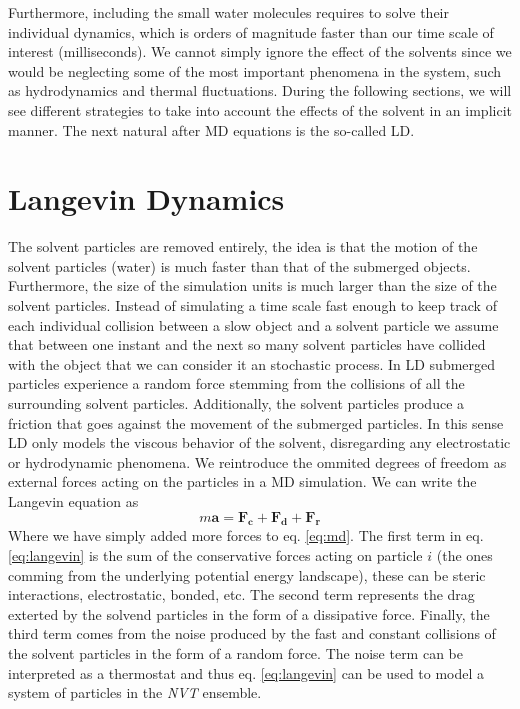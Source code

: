 \documentclass[ twoside,openright,titlepage,numbers=noenddot,%
headinclude,footinclude,cleardoublepage=empty,abstract=on,
BCOR=5mm,paper=a4,fontsize=11pt, dvipsnames
]{scrreprt}
\renewcommand{\vec}[1]{\bm{#1}}
\begin{document}
Furthermore, including the small water molecules requires to solve their individual dynamics, which is orders of magnitude faster than our time scale of interest (milliseconds). We cannot simply ignore the effect of the solvents since we would be neglecting some of the most important phenomena in the system, such as hydrodynamics and thermal fluctuations.
During the following sections, we will see different strategies to take into account the effects of the solvent in an implicit manner.
The next natural after \gls{MD} equations is the so-called \gls{LD}.

\section{Langevin Dynamics}\label{sec:langevin}

The solvent particles are removed entirely, the idea is that the motion of the solvent particles (water) is much faster than that of the submerged objects. Furthermore, the size of the simulation units is much larger than the size of the solvent particles. Instead of simulating a time scale fast enough to keep track of each individual collision between a slow object and a solvent particle we assume that between one instant and the next so many solvent particles have collided with the object that we can consider it an stochastic process.
In \gls{LD} submerged particles experience a random force stemming from the collisions of all the surrounding solvent particles. Additionally, the solvent particles produce a friction that goes against the movement of the submerged particles.
In this sense \gls{LD} only models the viscous behavior of the solvent, disregarding any electrostatic or hydrodynamic phenomena.
We reintroduce the ommited degrees of freedom as external forces acting on the particles in a \gls{MD} simulation. We can write the Langevin equation as
\begin{equation}
  \label{eq:langevin}
  m\vec{a} = \vec{F_c} + \vec{F_d} + \vec{F_r}
\end{equation}
Where we have simply added more forces to eq. \eqref{eq:md}. The first term in eq. \eqref{eq:langevin} is the sum of the conservative forces acting on particle $i$ (the ones comming from the underlying potential energy landscape), these can be steric interactions, electrostatic, bonded, etc. The second term represents the drag exterted by the solvend particles in the form of a dissipative force. Finally, the third term comes from the noise produced by the fast and constant collisions of the solvent particles in the form of a random force. The noise term can be interpreted as a thermostat and thus eq. \eqref{eq:langevin} can be used to model a system of particles in the \emph{NVT} ensemble.
\end{document}
